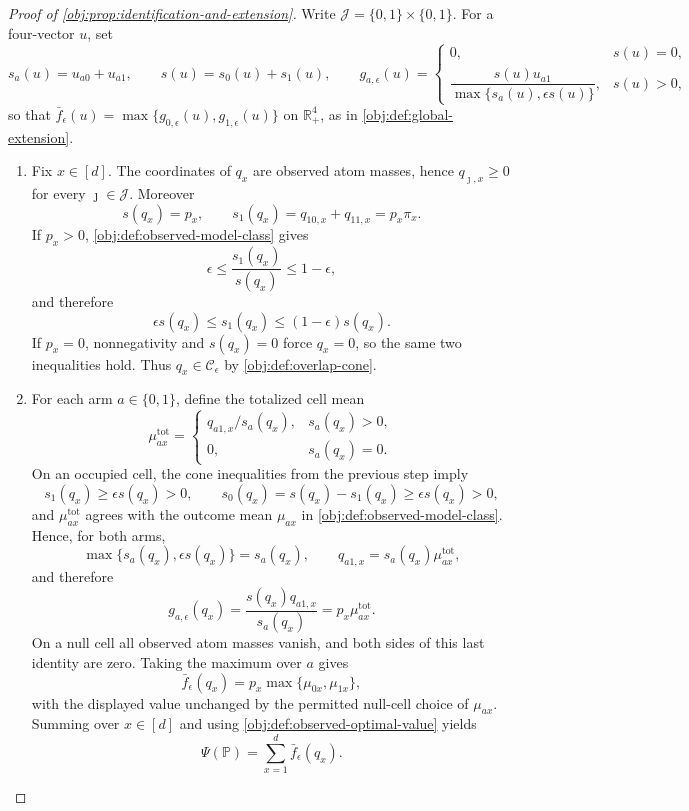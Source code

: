 \begin{proof}[Proof of \cref{obj:prop:identification-and-extension}]
Write \(\mathcal J=\{0,1\}\times\{0,1\}\).  For a four-vector \(u\), set
\[
s_a(u)=u_{a0}+u_{a1},
\qquad
s(u)=s_0(u)+s_1(u),
\qquad
g_{a,\epsilon}(u)=
\begin{cases}
0, & s(u)=0,\\[2mm]
\dfrac{s(u)u_{a1}}{\max\{s_a(u),\epsilon s(u)\}}, & s(u)>0,
\end{cases}
\]
so that \(\bar f_\epsilon(u)=\max\{g_{0,\epsilon}(u),g_{1,\epsilon}(u)\}\) on
\(\mathbb R_+^4\), as in \cref{obj:def:global-extension}.

\begin{enumerate}
\item Fix \(x\in[d]\).  The coordinates of \(q_x\) are observed atom masses, hence
\(q_{\jmath,x}\ge 0\) for every \(\jmath\in\mathcal J\).  Moreover
\[
s(q_x)=p_x,
\qquad
s_1(q_x)=q_{10,x}+q_{11,x}=p_x\pi_x .
\]
If \(p_x>0\), \cref{obj:def:observed-model-class} gives
\[
\epsilon\le \frac{s_1(q_x)}{s(q_x)}\le 1-\epsilon,
\]
and therefore
\[
\epsilon s(q_x)\le s_1(q_x)\le (1-\epsilon)s(q_x).
\]
If \(p_x=0\), nonnegativity and \(s(q_x)=0\) force \(q_x=0\), so the same two inequalities hold.  Thus \(q_x\in\mathcal C_\epsilon\) by \cref{obj:def:overlap-cone}. %

\item For each arm \(a\in\{0,1\}\), define the totalized cell mean
\[
\mu^{\mathrm{tot}}_{ax}
=
\begin{cases}
q_{a1,x}/s_a(q_x), & s_a(q_x)>0,\\
0, & s_a(q_x)=0.
\end{cases}
\]
On an occupied cell, the cone inequalities from the previous step imply
\[
s_1(q_x)\ge \epsilon s(q_x)>0,
\qquad
s_0(q_x)=s(q_x)-s_1(q_x)\ge \epsilon s(q_x)>0,
\]
and \(\mu^{\mathrm{tot}}_{ax}\) agrees with the outcome mean \(\mu_{ax}\) in
\cref{obj:def:observed-model-class}.  Hence, for both arms,
\[
\max\{s_a(q_x),\epsilon s(q_x)\}=s_a(q_x),
\qquad
q_{a1,x}=s_a(q_x)\mu^{\mathrm{tot}}_{ax},
\]
and therefore
\[
g_{a,\epsilon}(q_x)
=\frac{s(q_x)q_{a1,x}}{s_a(q_x)}
=p_x\mu^{\mathrm{tot}}_{ax}.
\]
On a null cell all observed atom masses vanish, and both sides of this last identity are zero.  Taking the maximum over \(a\) gives
\[
\bar f_\epsilon(q_x)=p_x\max\{\mu_{0x},\mu_{1x}\},
\]
with the displayed value unchanged by the permitted null-cell choice of \(\mu_{ax}\).  Summing over \(x\in[d]\) and using \cref{obj:def:observed-optimal-value} yields
\[
\Psi(\mathbb P)=\sum_{x=1}^d \bar f_\epsilon(q_x).
\] %


\end{enumerate}
\end{proof}
